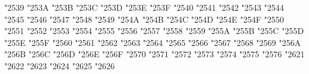 {\Uchar\jis"2539 %
\Uchar\jis"253A %
\Uchar\jis"253B %
\Uchar\jis"253C %
\Uchar\jis"253D %
\Uchar\jis"253E %
\Uchar\jis"253F %
\Uchar\jis"2540 %
\Uchar\jis"2541 %
\Uchar\jis"2542 %
\Uchar\jis"2543 %
\Uchar\jis"2544 %
\Uchar\jis"2545 %
\Uchar\jis"2546 %
\Uchar\jis"2547 %
\Uchar\jis"2548 %
\Uchar\jis"2549 %
\Uchar\jis"254A %
\Uchar\jis"254B %
\Uchar\jis"254C %
\Uchar\jis"254D %
\Uchar\jis"254E %
\Uchar\jis"254F %
\Uchar\jis"2550 %
\Uchar\jis"2551 %
\Uchar\jis"2552 %
\Uchar\jis"2553 %
\Uchar\jis"2554 %
\Uchar\jis"2555 %
\Uchar\jis"2556 %
\Uchar\jis"2557 %
\Uchar\jis"2558 %
\Uchar\jis"2559 %
\Uchar\jis"255A %
\Uchar\jis"255B %
\Uchar\jis"255C %
\Uchar\jis"255D %
\Uchar\jis"255E %
\Uchar\jis"255F %
\Uchar\jis"2560 %
\Uchar\jis"2561 %
\Uchar\jis"2562 %
\Uchar\jis"2563 %
\Uchar\jis"2564 %
\Uchar\jis"2565 %
\Uchar\jis"2566 %
\Uchar\jis"2567 %
\Uchar\jis"2568 %
\Uchar\jis"2569 %
\Uchar\jis"256A %
\Uchar\jis"256B %
\Uchar\jis"256C %
\Uchar\jis"256D %
\Uchar\jis"256E %
\Uchar\jis"256F %
\Uchar\jis"2570 %
\Uchar\jis"2571 %
\Uchar\jis"2572 %
\Uchar\jis"2573 %
\Uchar\jis"2574 %
\Uchar\jis"2575 %
\Uchar\jis"2576 %
\Uchar\jis"2621 %
\Uchar\jis"2622 %
\Uchar\jis"2623 %
\Uchar\jis"2624 %
\Uchar\jis"2625 %
\Uchar\jis"2626 %
}
